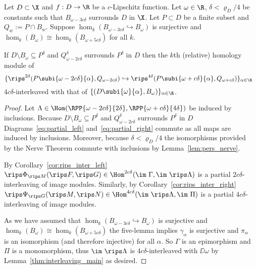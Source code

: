 \begin{theorem}\label{thm:interleaving_main_2}
  Let $D\subset\X$ and $f : D\to\R$ be a $c$-Lipschitz function.
  Let $\omega\in\R$, $\delta < \varrho_D/4$ be constants such that $B_{\omega-3c\delta}$ surrounds $D$ in $\X$.
  Let $P\subset D$ be a finite subset and $Q_w := P\cap B_w$.
  Suppose $\hom_k(B_{\omega-3c\delta}\hookrightarrow B_\omega)$ is surjective and $\hom_k(B_\omega)\cong\hom_k(B_{\omega+5c\delta})$ for all $k$.

  If $D\setminus B_\omega\subseteq P^\delta$ and $Q_{\omega-2c\delta}^\delta$ surrounds $P^\delta$ in $D$ then the $k$th (relative) homology module of
  \[\{\rips^{2\delta}(P\subi{\omega-2c\delta}{\alpha}, Q_{\omega-2c\delta})\hookrightarrow \rips^{4\delta}(P\subi{\omega+c\delta}{\alpha}, Q_{\omega+c\delta})\}_{\alpha\in\R}\]
  $4c\delta$-interleaved with that of $\{(D\subi{\omega}{\alpha}, B_\omega)\}_{\alpha\in\R}$.
\end{theorem}
\begin{proof}
  Let $\Lambda\in\Hom(\RPP{\omega-2c\delta}{2\delta}, \RPP{\omega+c\delta}{4\delta})$ be induced by inclusions.
  Because $D\setminus B_\omega\subseteq P^\delta$ and $Q_{\omega-2c\delta}^\delta$ surrounds $P^\delta$ in $D$ Diagrams~\ref{eq:partial_left} and~\ref{eq:partial_right} commute as all maps are induced by inclusions.
  Moreover, because $\delta < \varrho_D/4$ the isomorphisms provided by the Nerve Theorem commute with inclusions by Lemma~\ref{lem:pers_nerve}.

  By Corollary~\ref{cor:rips_inter_left} $\rips \Phi_{\rips M}(\rips F, \rips G)\in\Hom^{2c\delta}(\im~\Gamma,\im~\rips\Lambda)$ is a partial $2c\delta$-interleaving of image modules.
  Similarly, by Corollary~\ref{cor:rips_inter_right} $\rips \Psi_{\rips G} (\rips M,\rips N)\in\Hom^{4c\delta}(\im~\rips\Lambda, \im~\Pi)$ is a partial $4c\delta$-interleaving of image modules.

  As we have assumed that $\hom_k(B_{\omega-3c\delta}\hookrightarrow B_\omega)$ is surjective and $\hom_k(B_\omega)\cong\hom_k(B_{\omega+5c\delta})$ the five-lemma implies $\gamma_\alpha$ is surjective and $\pi_\alpha$ is an isomorphism (and therefore injective) for all $\alpha$.
  So $\Gamma$ is an epimorphism and $\Pi$ is a monomorphism, thus $\im~\rips\Lambda$ is $4c\delta$-interleaved with $\DD{\omega}$ by Lemma~\ref{thm:interleaving_main} as desired.
\end{proof}
